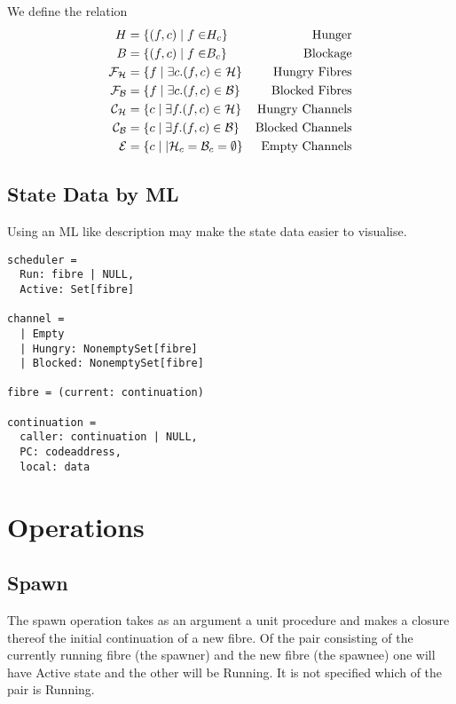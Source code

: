 \documentclass[oneside]{book}
\begin{document}
We define the relation 
\begin{align}
\mathrel H &= \{(f,c) \mid f \in \mathrel H_c\}&\rm Hunger\\
\mathrel B &= \{(f,c) \mid f \in \mathrel B_c\}&\rm Blockage\\
\mathcal F_{\mathcal H} &= \{f \mid \exists c . (f,c) \in \mathcal H\}&\rm Hungry\ Fibres\\
\mathcal F_{\mathcal B} &= \{f \mid \exists c . (f,c) \in \mathcal B\}&\rm Blocked\ Fibres\\
\mathcal C_{\mathcal H} &= \{ c \mid \exists f . (f,c) \in \mathcal H\}&\rm Hungry\ Channels\\
\mathcal C_{\mathcal B} &= \{ c \mid \exists f . (f,c) \in \mathcal B\}&\rm Blocked\ Channels\\
\mathcal E &= \{c \mid | \mathcal H_c = \mathcal B_c = \emptyset \}&\rm Empty\ Channels
\end{align}

\subsection{State Data by ML}
Using an ML like description may make the state data easier
to visualise.

\begin{verbatim}
scheduler =
  Run: fibre | NULL, 
  Active: Set[fibre]

channel = 
  | Empty 
  | Hungry: NonemptySet[fibre]
  | Blocked: NonemptySet[fibre]

fibre = (current: continuation)

continuation = 
  caller: continuation | NULL,
  PC: codeaddress,
  local: data
\end{verbatim}

\section{Operations}

\subsection{Spawn} 
The spawn operation takes as an argument a unit procedure and makes
a closure thereof the initial continuation
of a new fibre.  Of the pair consisting of the currently running
fibre (the spawner) and the new fibre (the spawnee) one will have Active
state and the other will be Running. It is not specified which
of the pair is Running.
\end{document}
